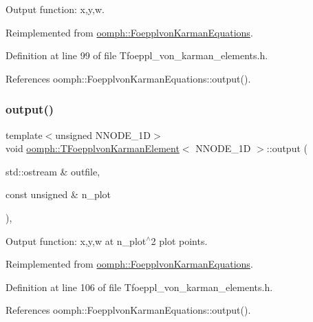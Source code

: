 Output function\+: x,y,w. 



Reimplemented from \hyperlink{classoomph_1_1FoepplvonKarmanEquations_a44739d9c804206ea60671b0de07ad154}{oomph\+::\+Foepplvon\+Karman\+Equations}.



Definition at line 99 of file Tfoeppl\+\_\+von\+\_\+karman\+\_\+elements.\+h.



References oomph\+::\+Foepplvon\+Karman\+Equations\+::output().

\mbox{\label{classoomph_1_1TFoepplvonKarmanElement_abd3241a32dacbf790074198c3c30a8c1}} 
\subsubsection{\texorpdfstring{output()}{output()}\hspace{0.1cm}{\footnotesize\ttfamily [2/4]}}
{\footnotesize\ttfamily template$<$unsigned N\+N\+O\+D\+E\+\_\+1D$>$ \\
void \hyperlink{classoomph_1_1TFoepplvonKarmanElement}{oomph\+::\+T\+Foepplvon\+Karman\+Element}$<$ N\+N\+O\+D\+E\+\_\+1D $>$\+::output (\begin{DoxyParamCaption}\item[{std\+::ostream \&}]{outfile,  }\item[{const unsigned \&}]{n\+\_\+plot }\end{DoxyParamCaption})\hspace{0.3cm}{\ttfamily [inline]}, {\ttfamily [virtual]}}



Output function\+: x,y,w at n\+\_\+plot$^\wedge$2 plot points. 



Reimplemented from \hyperlink{classoomph_1_1FoepplvonKarmanEquations_aa97cf4d70c7c059e6cb38557282156a5}{oomph\+::\+Foepplvon\+Karman\+Equations}.



Definition at line 106 of file Tfoeppl\+\_\+von\+\_\+karman\+\_\+elements.\+h.



References oomph\+::\+Foepplvon\+Karman\+Equations\+::output().

